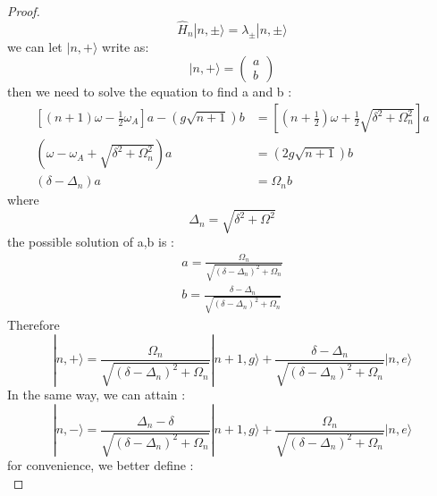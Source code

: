 \documentclass[10pt]{article}
\newcommand{\h}[1]{\hat{#1}}
\renewcommand{\ket}[1]{| #1 \rangle}
\begin{document}
        \begin{proof}
            \begin{equation}
                \h{H}_n \ket{n,\pm} = \lambda_{\pm} \ket{n,\pm}
            \end{equation}
            we can let $\ket{n,+}$ write as:
            \begin{equation}
                \ket{n,+} = 
                \begin{pmatrix}
                    a\\b
                \end{pmatrix}
            \end{equation}
            then we need to solve the equation to find a and b :
            \begin{align}
                \left[(n+1)\omega - \frac{1}{2}\omega_A \right]a - (g\sqrt{n+1}) b &= \left[(n+\frac{1}{2})\omega + \frac{1}{2}\sqrt{\delta^2 + \Omega_n^2}\right]a\\
                (\omega - \omega_A + \sqrt{\delta^2 + \Omega^2_n}) a&= (2g\sqrt{n+1})b\\
                (\delta - \Delta_n)a &= \Omega_n b
            \end{align}
            where
            \begin{equation}
                \Delta_n = \sqrt{\delta^2 + \Omega^2}
            \end{equation}
            the possible solution of a,b is :
            \begin{gather}
                a = \frac{\Omega_n}{\sqrt{(\delta-\Delta_n)^2 + \Omega_n}}\\
                b = \frac{\delta - \Delta_n}{\sqrt{(\delta-\Delta_n)^2 + \Omega_n}}
            \end{gather}
            Therefore
            \begin{equation}
                \ket{n,+} = \frac{\Omega_n}{\sqrt{(\delta-\Delta_n)^2 + \Omega_n}}\ket{n+1,g} + \frac{\delta - \Delta_n}{\sqrt{(\delta-\Delta_n)^2 + \Omega_n}} \ket{n,e}
            \end{equation}
            In the same way, we can attain :
            \begin{equation}
                \ket{n,-} = \frac{\Delta_n - \delta}{\sqrt{(\delta-\Delta_n)^2 + \Omega_n}} \ket{n+1,g} + \frac{\Omega_n}{\sqrt{(\delta-\Delta_n)^2 + \Omega_n}} \ket{n,e}
            \end{equation}
            for convenience, we better define :
            \begin{equation}

\end{equation}
\end{proof}
\end{document}
